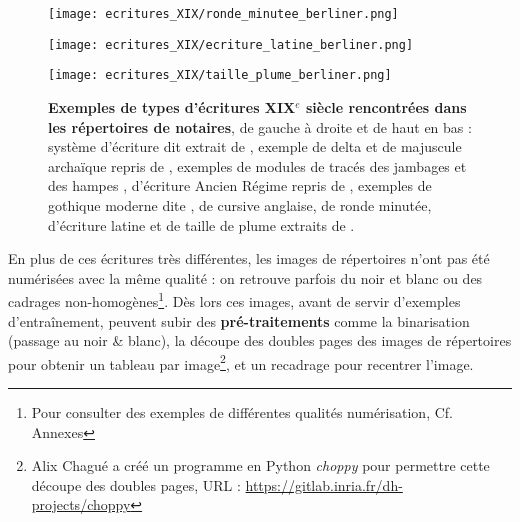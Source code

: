 \begin{figure}[h!]
    \centering
    \texttt{[image: ecritures\_XIX/ronde\_minutee\_berliner.png]}    
    \label{fig:my_label}
\end{figure}
\begin{figure}[!h]
        \centering
        \texttt{[image: ecritures\_XIX/ecriture\_latine\_berliner.png]}
\end{figure}
\begin{figure}[!h]
        \centering
        \texttt{[image: ecritures\_XIX/taille\_plume\_berliner.png]}
        \caption{\textbf{Exemples de types d'écritures XIX$^{e}$ siècle rencontrées dans les répertoires de notaires}, de gauche à droite et de haut en bas : système d'écriture dit  extrait de \cite{magnee_parfait_1828}, exemple de  delta et de  majuscule archaïque repris de \cite{molliard_methode_1861}, exemples de modules de tracés des jambages et des hampes \cite{werdet_innovation_1841}, d'écriture  Ancien Régime repris de \cite{fremont_cahiers_1837}, exemples de gothique moderne dite , de cursive anglaise, de ronde minutée, d'écriture latine et de taille de plume extraits de \cite{berliner_cours_1862}.}
    \label{fig:ecritures_XIX}
\end{figure}
\clearpage
En plus de ces écritures très différentes, les images de répertoires n'ont pas été numérisées avec la même qualité : on retrouve parfois du noir et blanc ou des cadrages non-homogènes\footnote{Pour consulter des exemples de différentes qualités numérisation, Cf. Annexes }. Dès lors ces images, avant de servir d'exemples d'entraînement, peuvent subir des \textbf{pré-traitements} comme la binarisation (passage au noir \& blanc), la découpe des doubles pages des images de répertoires pour obtenir un tableau par image\footnote{Alix Chagué a créé un programme en Python \textit{choppy} pour permettre cette découpe des doubles pages, URL : \url{https://gitlab.inria.fr/dh-projects/choppy}}, et un recadrage pour recentrer l'image.\\

